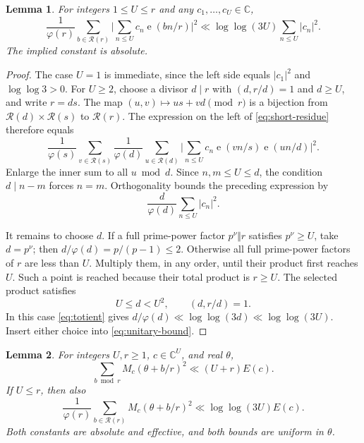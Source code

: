 \documentclass[11pt]{amsart}
\numberwithin{equation}{section}
\numberwithin{figure}{section}
\newtheorem{lemma}{Lemma}[section]
\theoremstyle{definition}
\newcommand{\C}{\mathbb{C}}
\newcommand{\e}{\operatorname{e}}
\begin{document}
\begin{lemma}\label{lem:short-residue}
For integers $1\le U\le r$ and any $c_1,\ldots,c_U\in\C$,
\begin{equation}\label{eq:short-residue}
 \frac1{\varphi(r)}\sum_{b\in\mathcal R(r)}
       \bigg|\sum_{n\le U}c_n\e(bn/r)\bigg|^2
 \ll \log\log(3U)\sum_{n\le U}|c_n|^2.
\end{equation}
The implied constant is absolute.
\end{lemma}

\begin{proof}
The case $U=1$ is immediate, since the left side equals $|c_1|^2$
and $\log\log3>0$.
For $U\ge2$, choose a divisor $d\mid r$ with $(d,r/d)=1$ and $d\ge U$,
and write $r=ds$.
The map $(u,v)\mapsto us+vd\pmod r$ is a bijection from
$\mathcal R(d)\times\mathcal R(s)$ to $\mathcal R(r)$.
The expression on the left of \eqref{eq:short-residue} therefore equals
\[
 \frac1{\varphi(s)}\sum_{v\in\mathcal R(s)}
 \frac1{\varphi(d)}\sum_{u\in\mathcal R(d)}
 \bigg|\sum_{n\le U}c_n\e(vn/s)\e(un/d)\bigg|^2.
\]
Enlarge the inner sum to all $u\bmod d$.
Since $n,m\le U\le d$, the condition $d\mid n-m$ forces $n=m$.
Orthogonality bounds the preceding expression by
\begin{equation}\label{eq:unitary-bound}
 \frac d{\varphi(d)}\sum_{n\le U}|c_n|^2.
\end{equation}

It remains to choose $d$. If a full prime-power factor $p^\nu\Vert r$
satisfies $p^\nu\ge U$, take $d=p^\nu$; then
$d/\varphi(d)=p/(p-1)\le2$.
Otherwise all full prime-power factors of $r$ are less than $U$.
Multiply them, in any order, until their product first reaches $U$.
Such a point is reached because their total product is $r\ge U$.
The selected product satisfies
\[
 U\le d<U^2,\qquad (d,r/d)=1.
\]
In this case \eqref{eq:totient} gives
$d/\varphi(d)\ll\log\log(3d)\ll\log\log(3U)$.
Insert either choice into \eqref{eq:unitary-bound}.
\end{proof}

\begin{lemma}\label{lem:maximal-sampling}
For integers $U,r\ge1$, $c\in\C^U$, and real $\theta$,
\begin{equation}\label{eq:maximal-all-residues}
 \sum_{b\bmod r}M_c(\theta+b/r)^2\ll (U+r)E(c).
\end{equation}
If $U\le r$, then also
\begin{equation}\label{eq:maximal-reduced-residues}
 \frac1{\varphi(r)}\sum_{b\in\mathcal R(r)}M_c(\theta+b/r)^2
 \ll\log\log(3U)E(c).
\end{equation}
Both constants are absolute and effective, and both bounds are uniform
in $\theta$.
\end{lemma}
\end{document}

